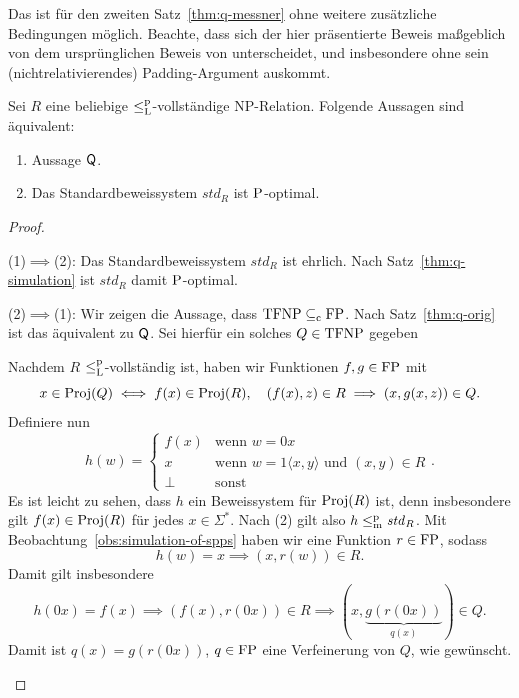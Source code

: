 Das ist für den zweiten Satz~\ref{thm:q-messner} ohne weitere zusätzliche Bedingungen möglich. Beachte, dass sich der hier präsentierte Beweis maßgeblich von dem ursprünglichen Beweis von \textcite[vgl.][Thm.~5.2]{messner_simulation_2001} unterscheidet, und insbesondere ohne sein (nichtrelativierendes) Padding-Argument auskommt.
\begin{theorem}\label{thm:q-messner-generalized}
    Sei $R$ eine beliebige $\leqlp$-vollständige NP-Relation.
    Folgende Aussagen sind äquivalent:
    \begin{enumerate}
        \item Aussage $\hQ$.
        \item Das Standardbeweissystem $\mathit{std}_R$ ist $\P$-optimal.
    \end{enumerate}
\end{theorem}
\begin{proof}
    \begin{prooflist}
    \item (1)$\implies$(2): 
        Das Standardbeweissystem $\mathit{std}_R$ ist ehrlich. Nach Satz~\ref{thm:q-simulation} ist $\mathit{std}_R$ damit $\P$-optimal.

    \item (2)$\implies$(1): Wir zeigen die Aussage, dass $\TFNP\subseteqc\FP$.  Nach Satz~\ref{thm:q-orig} ist das äquivalent zu $\hQ$. Sei hierfür ein solches $Q\in\TFNP$ gegeben

    Nachdem $R$ $\leqlp$-vollständig ist, haben wir Funktionen $f,g\in\FP$ mit
    \[ x\in \Proj(Q)\iff  f(x)\in\Proj(R), \quad (f(x), z)\in R\implies (x,g(x,z))\in Q. \]
    Definiere nun
    \[ h(w) = \begin{cases} f(x) & \text{wenn $w=0x$}\\ x & \text{wenn $w=1\langle x, y\rangle$ und $(x,y)\in R$} \\  \bot & \text{sonst} \end{cases}.\]
    Es ist leicht zu sehen, dass $h$ ein Beweissystem für $\Proj(R)$ ist, denn insbesondere gilt $f(x)\in\Proj(R)$ für jedes $x\in\Sigma^*$.
    Nach (2) gilt also $h\leqmp \mathit{std}_R$. Mit Beobachtung~\ref{obs:simulation-of-spps} haben wir eine Funktion $r\in\FP$, sodass
    \[ h(w)=x \implies (x, r(w))\in R. \]
    Damit gilt insbesondere
    \[ h(0x)=f(x)\implies (f(x), r(0x))\in R \implies (x, \underbrace{g(r(0x))}_{q(x)})\in Q. \]
    Damit ist $q(x) = g(r(0x))$, $q\in\FP$ eine Verfeinerung von $Q$, wie gewünscht.
\end{prooflist}
\end{proof}



